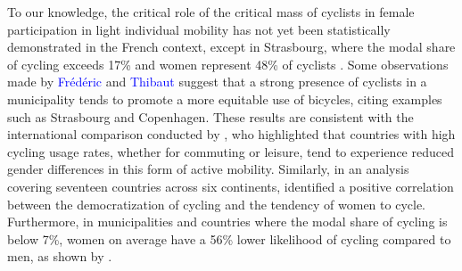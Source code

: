 \begin{refsegment}
To our knowledge, the critical role of the critical mass of cyclists in female participation in light individual mobility has not yet been statistically demonstrated in the French context, except in Strasbourg, where the modal share of cycling exceeds 17\% and women represent 48\% of cyclists \textcolor{blue}{\autocite[42]{certu_usagers_2013}}. Some observations made by \textcolor{blue}{Frédéric} \textcolor{blue}{\textcite[187]{heran_retour_2015}} and \textcolor{blue}{Thibaut} \textcolor{blue}{\textcite{schepman_pourquoi_2014}} suggest that a strong presence of cyclists in a municipality tends to promote a more equitable use of bicycles, citing examples such as Strasbourg and Copenhagen. These results are consistent with the international comparison conducted by \textcolor{blue}{\textcite[63]{garrard_revolutions_2006}}, who highlighted that countries with high cycling usage rates, whether for commuting or leisure, tend to experience reduced gender differences in this form of active mobility. Similarly, in an analysis covering seventeen countries across six continents, \textcolor{blue}{\textcite[70]{goel_cycling_2022}} identified a positive correlation between the democratization of cycling and the tendency of women to cycle. Furthermore, in municipalities and countries where the modal share of cycling is below 7\%, women on average have a 56\% lower likelihood of cycling compared to men, as shown by \textcolor{blue}{\textcite[70]{goel_cycling_2022}}. %


\end{refsegment}

